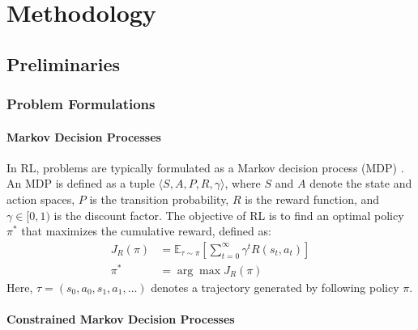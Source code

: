 \section{Methodology}


\subsection{Preliminaries}

\subsubsection{Problem Formulations}

\paragraph{Markov Decision Processes}

In RL, problems are typically formulated as a Markov decision process (MDP) \cite{sutton1998reinforcement}.
An MDP is defined as a tuple $\langle S, A, P, R, \gamma \rangle$, where $S$ and $A$ denote the state and action spaces, $P$ is the transition probability, $R$ is the reward function, and $\gamma \in [0, 1)$ is the discount factor.
The objective of RL is to find an optimal policy $\pi^*$ that maximizes the cumulative reward, defined as:
\begin{equation} \label{eq:mdp_optimization_problem}
    \begin{aligned}
        J_R(\pi) &= \mathbb{E}_{\tau \sim \pi}\!\left[\sum^\infty_{t = 0} \gamma^t R(s_t, a_t)\right] \\
        \pi^* &= \arg \max J_R(\pi)
    \end{aligned}
\end{equation}
Here, $\tau = (s_0, a_0, s_1, a_1, \ldots)$ denotes a trajectory generated by following policy $\pi$.

\paragraph{Constrained Markov Decision Processes}

